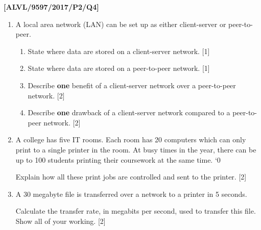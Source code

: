 \item \textbf{{[}ALVL/9597/2017/P2/Q4{]} }
\begin{enumerate}
\item A local area network (LAN) can be set up as either client-server or
peer-to-peer. 
\begin{enumerate}
\item State where data are stored on a client-server network. \hfill{}
{[}1{]}
\item State where data are stored on a peer-to-peer network. \hfill{} {[}1{]}
\item Describe \textbf{one} benefit of a client-server network over a peer-to-peer
network. \hfill{} {[}2{]}
\item Describe \textbf{one} drawback of a client-server network compared
to a peer-to-peer network.\hfill{} {[}2{]}
\end{enumerate}
\item A college has five IT rooms. Each room has 20 computers which can
only print to a single printer in the room. At busy times in the year,
there can be up to 100 students printing their coursework at the same
time. \textquoteleft 0

Explain how all these print jobs are controlled and sent to the printer.\hfill{}
{[}2{]}
\item A 30 megabyte file is transferred over a network to a printer in 5
seconds. 

Calculate the transfer rate, in megabits per second, used to transfer
this file. Show all of your working. \hfill{} {[}2{]}
\end{enumerate}